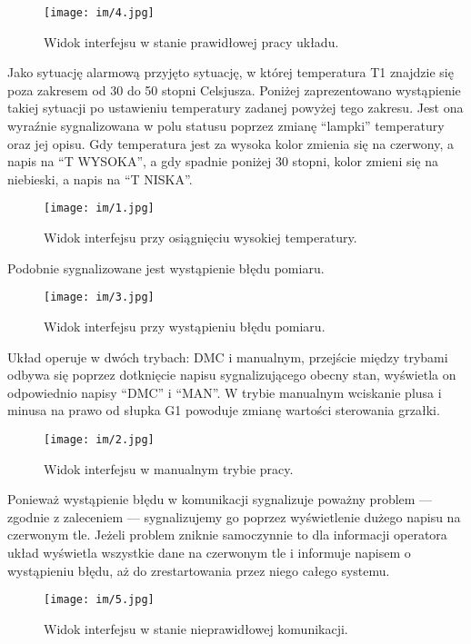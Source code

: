 \begin{figure}[H]
\centering
\texttt{[image: im/4.jpg]}
\caption{Widok interfejsu w stanie prawidłowej pracy układu.}
\label{R4}
\end{figure}


Jako sytuację alarmową przyjęto sytuację, w której temperatura T1 znajdzie się poza zakresem od 30 do 50 stopni Celsjusza. Poniżej zaprezentowano wystąpienie takiej sytuacji po ustawieniu temperatury zadanej powyżej tego zakresu. Jest ona wyraźnie sygnalizowana w polu statusu poprzez zmianę ``lampki'' temperatury oraz jej opisu. Gdy temperatura jest za wysoka kolor zmienia się na czerwony, a napis na ``T WYSOKA'', a gdy spadnie poniżej 30 stopni, kolor zmieni się na niebieski, a napis na ``T NISKA''.


\begin{figure}[H]
\centering
\texttt{[image: im/1.jpg]}
\caption{Widok interfejsu przy osiągnięciu wysokiej temperatury.}
\label{R1}
\end{figure}


Podobnie sygnalizowane jest wystąpienie błędu pomiaru.


\begin{figure}[H]
\centering
\texttt{[image: im/3.jpg]}
\caption{Widok interfejsu przy wystąpieniu błędu pomiaru.}
\label{R3}
\end{figure}


Układ operuje w dwóch trybach: DMC i manualnym, przejście między trybami odbywa się poprzez dotknięcie napisu sygnalizującego obecny stan, wyświetla on odpowiednio napisy ``DMC'' i ``MAN''. W trybie manualnym wciskanie plusa i minusa na prawo od słupka G1 powoduje zmianę wartości sterowania grzałki.


\begin{figure}[H]
\centering
\texttt{[image: im/2.jpg]}
\caption{Widok interfejsu w manualnym trybie pracy.}
\label{R2}
\end{figure}


Ponieważ wystąpienie błędu w komunikacji sygnalizuje poważny problem --- zgodnie z zaleceniem --- sygnalizujemy go poprzez wyświetlenie dużego napisu na czerwonym tle. Jeżeli problem zniknie samoczynnie to dla informacji operatora układ wyświetla wszystkie dane na czerwonym tle i informuje napisem o wystąpieniu błędu, aż do zrestartowania przez niego całego systemu.


\begin{figure}[H]
\centering
\texttt{[image: im/5.jpg]}
\caption{Widok interfejsu w stanie nieprawidłowej komunikacji.}
\label{R5}
\end{figure}


